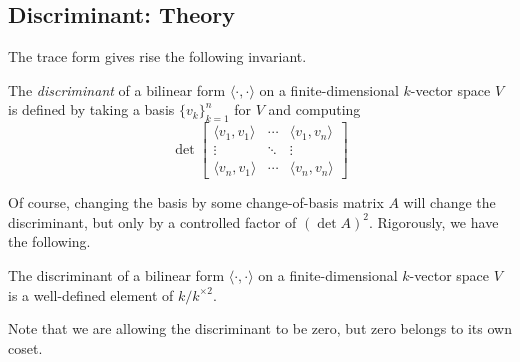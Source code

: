 \subsection{Discriminant: Theory}
The trace form gives rise the following invariant.
\begin{definition}[Discriminant]
	The \textit{discriminant} of a bilinear form $\langle\cdot,\cdot\rangle$ on a finite-dimensional $k$-vector space $V$ is defined by taking a basis $\{v_k\}_{k=1}^n$ for $V$ and computing
	\[\det\begin{bmatrix}
		\langle v_1,v_1\rangle & \cdots & \langle v_1,v_n\rangle \\
		\vdots & \ddots & \vdots \\
		\langle v_n,v_1\rangle & \cdots & \langle v_n,v_n\rangle
	\end{bmatrix}\]
\end{definition}
Of course, changing the basis by some change-of-basis matrix $A$ will change the discriminant, but only by a controlled factor of $(\det A)^2.$ Rigorously, we have the following.
\begin{lemma}
	The discriminant of a bilinear form $\langle\cdot,\cdot\rangle$ on a finite-dimensional $k$-vector space $V$ is a well-defined element of $k/k^{\times2}.$
\end{lemma}
Note that we are allowing the discriminant to be zero, but zero belongs to its own coset.
